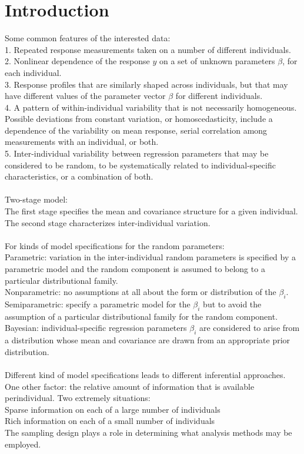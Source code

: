 \section{Introduction}
Some common features of the interested data: \\
1. Repeated response measurements taken on a number of different individuals. \\
2. Nonlinear dependence of the response $y$ on a set of unknown parameters $\beta$, for each individual. \\
3. Response profiles that are similarly shaped across individuals, but that may have different values of the parameter vector $\beta$ for different individuals. \\
4. A pattern of within-individual variability that is not necessarily homogeneous. Possible deviations from constant variation, or homoscedasticity, include a dependence of the variability on mean response, serial correlation among measurements with an individual, or both.  \\
5. Inter-individual variability between regression parameters that may be considered to be random, to be systematically related to individual-specific characteristics, or a combination of both. \\
\\
Two-stage model:\\
The first stage specifies the mean and covariance structure for a given individual. \\
The second stage characterizes inter-individual variation. \\
\\
For kinds of model specifications for the random parameters:\\
Parametric: variation in the inter-individual random parameters is specified by a parametric model and the random component is assumed to belong to a particular distributional family. \\
Nonparametric: no assumptions at all about the form or distribution of the $\beta_i$. \\
Semiparametric: specify a parametric model for the $\beta_i$ but to avoid the assumption of a particular distributional family for the random component. \\
Bayesian: individual-specific regression parameters $\beta_i$ are considered to arise from a distribution whose mean and covariance are drawn from an appropriate prior distribution. \\
\\
Different kind of model specifications leads to different inferential approaches.
One other factor: the relative amount of information that is available perindividual. Two extremely situations: \\
Sparse information on each of a large number of individuals \\
Rich information on each of a small number of individuals \\
The sampling design plays a role in determining what analysis methods may be employed. \\